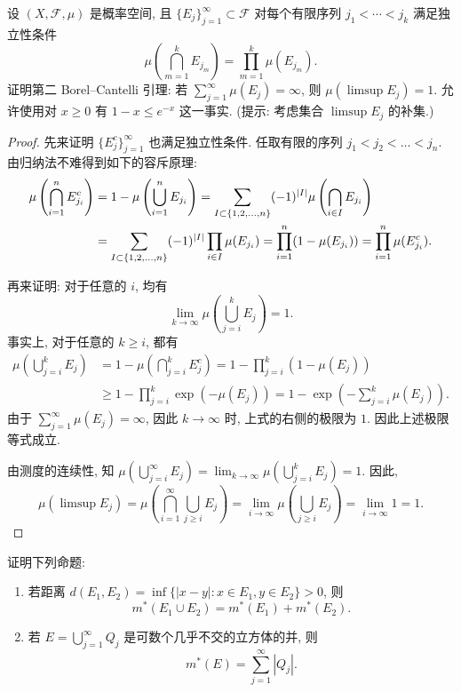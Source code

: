 \documentclass{article}
\begin{document}
\begin{problem}
  设 $(X,\mathcal{F},\mu)$ 是概率空间, 且 $\{E_j\}_{j=1}^\infty\subset\mathcal{F}$ 对每个有限序列 $j_1<\cdots<j_k$ 满足独立性条件
  \[
    \mu\left(\bigcap_{m=1}^k E_{j_m}\right)=\prod_{m=1}^k\mu(E_{j_m}).
  \]
  证明第二 Borel--Cantelli 引理: 若 $\sum_{j=1}^\infty\mu(E_j)=\infty$, 则 $\mu(\limsup E_j)=1$. 允许使用对 $x\geq 0$ 有 $1-x\leq e^{-x}$ 这一事实. (提示: 考虑集合 $\limsup E_j$ 的补集.)
\end{problem}

\begin{proof}
	先来证明 $\{E_j^c\}_{j = 1}^{\infty}$ 也满足独立性条件. 任取有限的序列 $j_1 < j_2 < \dots < j_n$. 由归纳法不难得到如下的容斥原理:
	\begin{align*}
		\mu \left( \bigcap_{i=1}^{n}E_{j_i}^c \right)
		&= 1 - \mu \left( \bigcup_{i=1}^{n}E_{j_i} \right)
		= \sum_{I \subset \{1,2,\dots,n\}}^{} (-1)^{\left|I\right|} \mu \left( \bigcap_{i \in I}^{}E_{j_i} \right) \\
		&= \sum_{I \subset \{1,2,\dots,n\}}^{} (-1)^{\left|I\right|} \prod_{i \in I}^{}\mu(E_{j_i}) 
		= \prod_{i=1}^{n}(1 - \mu(E_{j_i}))
		= \prod_{i=1}^{n} \mu(E_{j_i}^c).
	\end{align*}
	
	再来证明: 对于任意的 $i$, 均有
	\[ \lim_{k \to \infty} \mu\left( \bigcup_{j = i}^{k}E_j \right) = 1. \]
	事实上, 对于任意的 $k \ge i$, 都有
	\begin{align*}
		\mu \left( \bigcup_{j = i}^{k} E_j \right) 
		&= 1 - \mu \left( \bigcap_{j = i}^{k} E_j^c \right) = 1 - \prod_{j = i}^{k} (1 - \mu (E_j)) \\
		&\ge 1 - \prod_{j = i}^{k} \exp (- \mu (E_j))
		= 1 - \exp \left( - \sum_{j = i}^{k} \mu (E_j) \right).
	\end{align*}
	由于 $\sum_{j=1}^{\infty} \mu(E_j) = \infty$, 因此 $k \to \infty$ 时, 上式的右侧的极限为 $1$. 因此上述极限等式成立.

	由测度的连续性, 知 $\mu(\bigcup_{j = i}^{\infty} E_j) = \lim_{k \to \infty} \mu(\bigcup_{j = i}^{k} E_j) = 1$. 因此, 
	\[ \mu (\limsup E_j) = \mu \left( \bigcap_{i=1}^{\infty} \bigcup_{j \ge i}^{}E_j \right) = \lim_{i \to \infty} \mu \left( \bigcup_{j \ge i}^{}E_j \right) = \lim_{i \to \infty} 1 = 1. \]
\end{proof}



\begin{problem}
  证明下列命题:
  \begin{enumerate}
    \item[(i)] 若距离 $d(E_1,E_2)=\inf\{|x-y|:x\in E_1,y\in E_2\}>0$, 则
      \[
        m^*(E_1\cup E_2)=m^*(E_1)+m^*(E_2).
      \]
    \item[(ii)] 若 $E=\bigcup_{j=1}^\infty Q_j$ 是可数个几乎不交的立方体的并, 则
      \[
        m^*(E)=\sum_{j=1}^\infty|Q_j|.
      \]
  \end{enumerate}
\end{problem}
\end{document}

